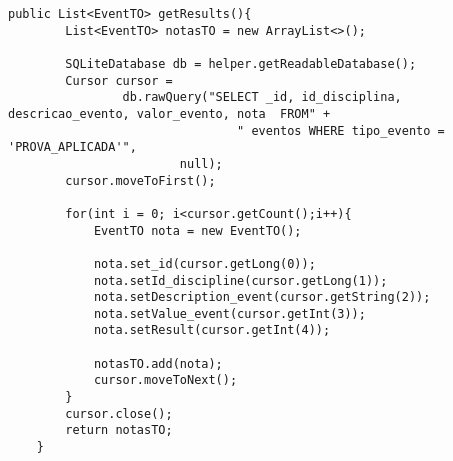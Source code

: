 \begin{lstlisting}[style=custom_JAVA]
public List<EventTO> getResults(){
        List<EventTO> notasTO = new ArrayList<>();

        SQLiteDatabase db = helper.getReadableDatabase();
        Cursor cursor =
                db.rawQuery("SELECT _id, id_disciplina, descricao_evento, valor_evento, nota  FROM" +
                                " eventos WHERE tipo_evento = 'PROVA_APLICADA'",
                        null);
        cursor.moveToFirst();

        for(int i = 0; i<cursor.getCount();i++){
            EventTO nota = new EventTO();

            nota.set_id(cursor.getLong(0));
            nota.setId_discipline(cursor.getLong(1));
            nota.setDescription_event(cursor.getString(2));
            nota.setValue_event(cursor.getInt(3));
            nota.setResult(cursor.getInt(4));

            notasTO.add(nota);
            cursor.moveToNext();
        }
        cursor.close();
        return notasTO;
    }
\end{lstlisting}